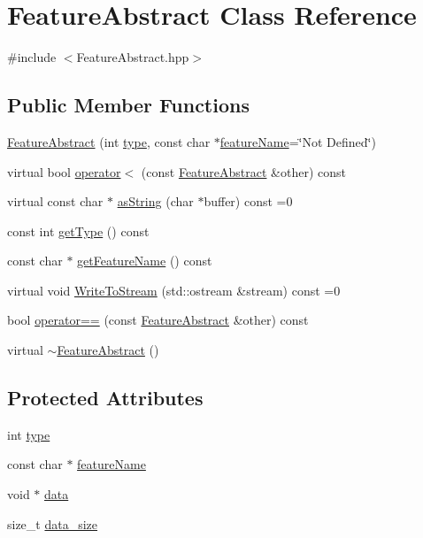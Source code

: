 \hypertarget{class_feature_abstract}{\section{Feature\+Abstract Class Reference}
\label{class_feature_abstract}
}


{\ttfamily \#include $<$Feature\+Abstract.\+hpp$>$}

\subsection*{Public Member Functions}
\begin{DoxyCompactItemize}
\item 
\hyperlink{class_feature_abstract_afb925654d107910da20b213080e8a013}{Feature\+Abstract} (int \hyperlink{class_feature_abstract_acab3574e41f892ae811b4adac8f5840a}{type}, const char $\ast$\hyperlink{class_feature_abstract_ae11ff57d87c0e49cf1cf95d71f407979}{feature\+Name}=\char`\"{}Not Defined\char`\"{})
\item 
virtual bool \hyperlink{class_feature_abstract_a88fb78d10c6f5395c88ff0ae23fe8b8f}{operator$<$} (const \hyperlink{class_feature_abstract}{Feature\+Abstract} \&other) const 
\item 
virtual const char $\ast$ \hyperlink{class_feature_abstract_af9ffe853716e6a28135ae1c33fafeafd}{as\+String} (char $\ast$buffer) const =0
\item 
const int \hyperlink{class_feature_abstract_a4cb21d5a97d7f537cda3c919c266a6cf}{get\+Type} () const 
\item 
const char $\ast$ \hyperlink{class_feature_abstract_a4b12b0d228da1c7e21429f263bef004e}{get\+Feature\+Name} () const 
\item 
virtual void \hyperlink{class_feature_abstract_a43cad67d17b3f23f1687862526126a1b}{Write\+To\+Stream} (std\+::ostream \&stream) const =0
\item 
bool \hyperlink{class_feature_abstract_a8a2253d5e532ba6c95fe3653558c30c5}{operator==} (const \hyperlink{class_feature_abstract}{Feature\+Abstract} \&other) const 
\item 
virtual \hyperlink{class_feature_abstract_ad4a51a8818f23596fc88ef89a79ff125}{$\sim$\+Feature\+Abstract} ()
\end{DoxyCompactItemize}
\subsection*{Protected Attributes}
\begin{DoxyCompactItemize}
\item 
int \hyperlink{class_feature_abstract_acab3574e41f892ae811b4adac8f5840a}{type}
\item 
const char $\ast$ \hyperlink{class_feature_abstract_ae11ff57d87c0e49cf1cf95d71f407979}{feature\+Name}
\item 
void $\ast$ \hyperlink{class_feature_abstract_a088a09441e0d60ad556c37910e51e8a6}{data}
\item 
size\+\_\+t \hyperlink{class_feature_abstract_a99b0e94ca4cdf08688924517946b5743}{data\+\_\+size}
\end{DoxyCompactItemize}
